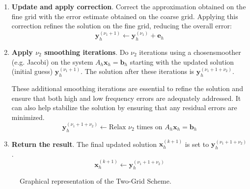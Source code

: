 \begin{enumerate}
    \item \textbf{Update and apply correction}. Correct the approximation obtained on the fine grid with the error estimate obtained on the coarse grid. Applying this correction refines the solution on the fine grid, reducing the overall error:
    \begin{equation*}
        \mathbf{y}_{h}^{\left(\nu_{1}+1\right)} \leftarrow \mathbf{y}_{h}^{\left(\nu_{1}\right)} + \mathbf{e}_{h}
    \end{equation*}

    \item \textbf{Apply $\nu_{2}$ smoothing iterations}. Do $\nu_{2}$ iterations using a chosen\break smoother (e.g. Jacobi) on the system $A_{h}\mathbf{x}_{h} = \mathbf{b}_{h}$ starting with the updated solution (initial guess) $\mathbf{y}_{h}^{\left(\nu_{1}+1\right)}$. The solution after these iterations is $\mathbf{y}_{h}^{\left(\nu_{1}+1+\nu_{2}\right)}$.
    
    These additional smoothing iterations are essential to refine the solution and ensure that both high and low frequency errors are adequately addressed. It can also help stabilize the solution by ensuring that any residual errors are minimized.
    \begin{equation*}
        \mathbf{y}_{h}^{\left(\nu_{1} + 1 + \nu_{2}\right)} \leftarrow \text{Relax } \nu_{2} \text{ times on } A_{h}\mathbf{x}_{h} = \mathbf{b}_{h}
    \end{equation*}

    \item \textbf{Return the result}. The final updated solution $\mathbf{x}_{h}^{\left(k+1\right)}$ is set to $\mathbf{y}_{h}^{\left(\nu_{1} + 1 + \nu_{2}\right)}$.
    \begin{equation*}
        \mathbf{x}_{h}^{\left(k+1\right)} \leftarrow \mathbf{y}_{h}^{\left(\nu_{1} + 1 + \nu_{2}\right)}
    \end{equation*}
\end{enumerate}

\begin{figure}[!htp]
    \centering
    \resizebox{\textwidth}{!}{}
    \caption{Graphical representation of the Two-Grid Scheme.}
\end{figure}